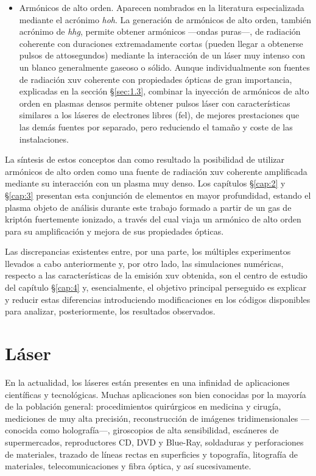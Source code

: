 \begin{itemize}
  \item Armónicos de alto orden. Aparecen nombrados en la literatura especializada mediante el acrónimo \emph{\acrfull{hoh}}. La generación de armónicos de alto orden, también acrónimo de \emph{\acrfull{hhg}}, permite obtener armónicos ---ondas puras---, de radiación coherente con duraciones extremadamente cortas (pueden llegar a obtenerse pulsos de attosegundos) mediante la interacción de un láser muy intenso con un blanco generalmente gaseoso o sólido. Aunque individualmente son fuentes de radiación \acrshort{xuv} coherente con propiedades ópticas de gran importancia, explicadas en la sección \S\ref{sec:1.3}, combinar la inyección de armónicos de alto orden en plasmas densos permite obtener pulsos láser con características similares a los láseres de electrones libres (\acrshort{fel}), de mejores prestaciones que las demás fuentes por separado, pero reduciendo el tamaño y coste de las instalaciones. 

\end{itemize}

La síntesis de estos conceptos dan como resultado la posibilidad de utilizar armónicos de alto orden como una fuente de radiación \acrshort{xuv} coherente amplificada mediante su interacción con un plasma muy denso. Los capítulos \S\ref{cap:2} y \S\ref{cap:3} presentan esta conjunción de elementos en mayor profundidad, estando el plasma objeto de análisis durante este trabajo formado a partir de un gas de kriptón fuertemente ionizado, a través del cual viaja un armónico de alto orden para su amplificación y mejora de sus propiedades ópticas. 

Las discrepancias existentes entre, por una parte, los múltiples experimentos llevados a cabo anteriormente y, por otro lado, las simulaciones numéricas, respecto a las características de la emisión \acrshort{xuv} obtenida, son el centro de estudio del capítulo \S\ref{cap:4} y, esencialmente, el objetivo principal perseguido es explicar y reducir estas diferencias introduciendo modificaciones en los códigos disponibles para analizar, posteriormente, los resultados observados.

\section{Láser}\label{sec:1.1}
En la actualidad, los láseres están presentes en una infinidad de aplicaciones científicas y tecnológicas. Muchas aplicaciones son bien conocidas por la mayoría de la población general: procedimientos quirúrgicos en medicina y cirugía, mediciones de muy alta precisión, reconstrucción de imágenes tridimensionales ---conocida como holografía---, giroscopios de alta sensibilidad, escáneres de supermercados, reproductores CD, DVD y Blue-Ray, soldaduras y perforaciones de materiales, trazado de líneas rectas en superficies y topografía, litografía de materiales, telecomunicaciones y fibra óptica, y así sucesivamente.

